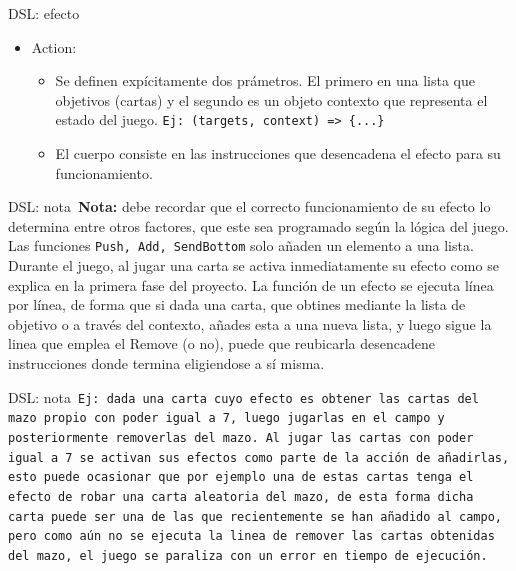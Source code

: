 \documentclass[a4paper, 12pt]{beamer}
\begin{document}
\begin{frame}{\textcolor{plata}{DSL: efecto}}\
\begin{itemize}
\item Action: 
\begin{itemize}
\item Se definen expícitamente dos prámetros. El primero en una lista que objetivos (cartas) y el segundo es un objeto contexto que representa el estado del juego. \texttt{Ej: (targets, context) => \{...\}}
\item El cuerpo consiste en las instrucciones que desencadena el efecto para su funcionamiento.
\end{itemize}
\end{itemize}
\end{frame}

\begin{frame}{\textcolor{plata}{DSL: nota}}\
\textbf{Nota:} debe recordar que el correcto funcionamiento de su efecto lo determina entre otros factores, que este sea programado según la lógica del juego. Las funciones \texttt{Push, Add, SendBottom} solo añaden un elemento a una lista. Durante el juego, al jugar una carta se activa inmediatamente su efecto como se explica en la primera fase del proyecto. La función de un efecto se ejecuta línea por línea, de forma que si dada una carta, que obtines mediante la lista de objetivo o a través del contexto, añades esta a una nueva lista, y luego sigue la linea que emplea el Remove (o no), puede que reubicarla desencadene instrucciones donde termina eligiendose a sí misma.
\end{frame}

\begin{frame}{\textcolor{plata}{DSL: nota}}\
\texttt{Ej: dada una carta cuyo efecto es obtener las cartas del mazo propio con poder igual a 7, luego jugarlas en el campo y posteriormente removerlas del mazo. Al jugar las cartas con poder igual a 7 se activan sus efectos como parte de la acción de añadirlas, esto puede ocasionar que por ejemplo una de estas cartas tenga el efecto de robar una carta aleatoria del mazo, de esta forma dicha carta puede ser una de las que recientemente se han añadido al campo, pero como aún no se ejecuta la linea de remover las cartas obtenidas del mazo, el juego se paraliza con un error en tiempo de ejecución.}
\end{frame}
\end{document}
